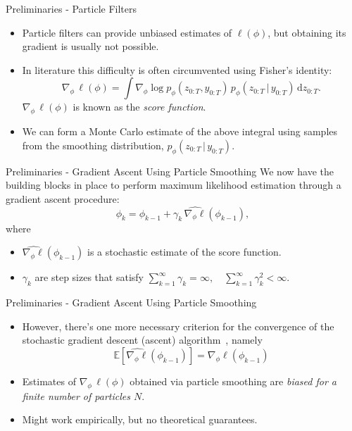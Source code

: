 \documentclass[10pt, aspectratio=1610]{beamer}
\newcommand{\given}{\,|\,}
\newcommand{\dd}{\mathrm{d}}
\begin{document}
    \begin{frame}{Preliminaries - Particle Filters}
      \begin{itemize}[<+->]
        \setlength\itemsep{1.5em}
        \item Particle filters can provide unbiased estimates of $\ell(\phi)$, but obtaining its gradient is usually not possible.
        \item In literature this difficulty is often circumvented using Fisher's identity:
          \begin{equation}
            \nabla_\phi \, \ell(\phi) = \int \nabla_\phi \log p_{\phi}(z_{0:T}, y_{0:T}) \, p_\phi(z_{0:T} \given y_{0:T}) \, \dd z_{0:T}.
          \end{equation}
          $\nabla_\phi \, \ell(\phi)$ is known as the \emph{score function}.
        \item We can form a Monte Carlo estimate of the above integral using samples from the smoothing distribution, $p_\phi(z_{0:T} \given y_{0:T})$.
      \end{itemize} 
    \end{frame}

    \begin{frame}{Preliminaries - Gradient Ascent Using Particle Smoothing}
        We now have the building blocks in place to perform maximum likelihood estimation through a gradient ascent procedure:
        \begin{equation}
            \phi_k = \phi_{k-1} + \gamma_k \, \widehat{\nabla_\phi \ell}(\phi_{k-1}),
        \end{equation}
        where
        \begin{itemize}
          \item $\widehat{\nabla_\phi \ell}(\phi_{k-1})$ is a stochastic estimate of the score function.
          \item $\gamma_k$ are step sizes that satisfy $\sum_{k=1}^\infty \gamma_k = \infty, \quad \sum_{k=1}^\infty \gamma_k^2 < \infty$.
        \end{itemize}
    \end{frame}

    \begin{frame}{Preliminaries - Gradient Ascent Using Particle Smoothing}
      \begin{itemize}[<+->]
        \setlength\itemsep{1.5em}
        \item However, there's one more necessary criterion for the convergence of the stochastic gradient descent (ascent) algorithm~\citep{robbins1951stochastic}, namely
          \begin{equation}
            \mathbb{E}\left[\widehat{\nabla_\phi \ell}(\phi_{k-1})\right] = \nabla_\phi \ell(\phi_{k-1})
          \end{equation}
        \item Estimates of $\nabla_\phi \, \ell(\phi)$ obtained via particle smoothing are \emph{biased for a finite number of particles $N$}.
        \item Might work empirically, but no theoretical guarantees.
      \end{itemize}
    \end{frame}
\end{document}
